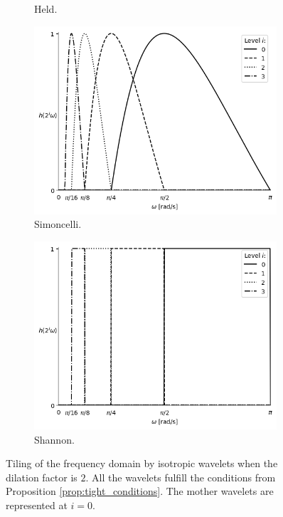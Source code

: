 \documentclass{InsightArticle}
\theoremstyle{definition}
\begin{document}
\begin{figure}[H]
\begin{subfigure}[t]{.49\textwidth}
    \captionsetup{width=\textwidth}
    \caption{Held.}
    \label{fig:mother_held}
  \end{subfigure}
  \vspace*{\floatsep}
  \begin{subfigure}[t]{.49\textwidth}
    \centering
    \includegraphics[width=0.99\textwidth]{profileMotherWavelet_Simoncelli_5_Mother.png}
    \captionsetup{width=\textwidth}
    \caption{Simoncelli.}
    \label{fig:mother_simoncelli}
  \end{subfigure}
  \begin{subfigure}[t]{.49\textwidth}
    \centering
    \includegraphics[width=0.99\textwidth]{profileMotherWavelet_Shannon_5_Mother.png}
    \captionsetup{width=\textwidth}
    \caption{Shannon.}
    \label{fig:mother_shannon}
  \end{subfigure}
  \caption{Tiling of the frequency domain by isotropic wavelets when the dilation factor is $2$. All the wavelets fulfill the conditions from Proposition \ref{prop:tight_conditions}. The mother wavelets are represented at $i=0$. }
  \label{fig:mother_wavelets}
\end{figure}
\end{document}
